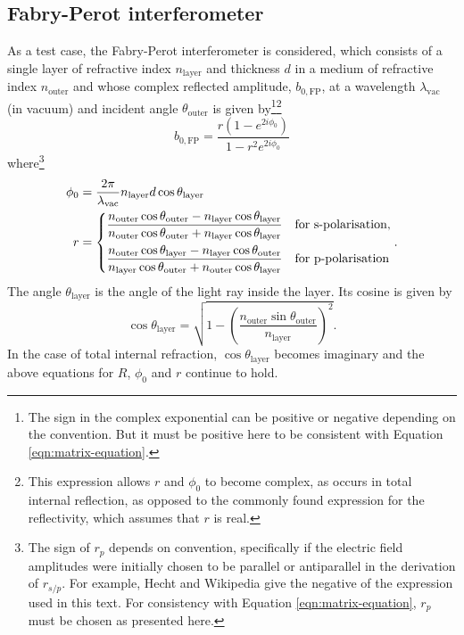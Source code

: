 \documentclass[]{article}
\begin{document}
	\subsection{Fabry-Perot interferometer}
As a test case, the Fabry-Perot interferometer is considered, which consists of a single layer of refractive index $n_\text{layer}$ and thickness $d$ in a medium of refractive index $n_\text{outer}$ and whose complex reflected amplitude, $b_{0,\text{FP}}$, at a wavelength $\lambda_\text{vac}$ (in vacuum) and incident angle $\theta_\text{outer}$ is given by\footnote{The sign in the complex exponential can be positive or negative depending on the convention. But it must be positive here to be consistent with Equation \ref{eqn:matrix-equation}.}\footnote{This expression allows $r$ and $\phi_0$ to become complex, as occurs in total internal reflection, as opposed to the commonly found expression for the reflectivity, which assumes that $r$ is real.}
\begin{equation}
	b_{0,\text{FP}}=\frac{r(1-e^{2i\phi_0})}{1-r^2 e^{2i\phi_0}}
\end{equation}
where\footnote{The sign of $r_p$ depends on convention, specifically if the electric field amplitudes were initially chosen to be parallel or antiparallel in the derivation of $r_{s/p}$. For example, Hecht and Wikipedia give the negative of the expression used in this text. For consistency with Equation \ref{eqn:matrix-equation}, $r_p$ must be chosen as presented here.}
\begin{align}
	\phi_0&=\frac{2\pi}{\lambda_\text{vac}}n_\text{layer}d\cos\theta_\text{layer}\\
	r&=
	\begin{dcases}
		\frac{n_\text{outer}\cos\theta_\text{outer}-n_\text{layer}\cos\theta_\text{layer}}{n_\text{outer}\cos\theta_\text{outer}+n_\text{layer}\cos\theta_\text{layer}}&\text{for s-polarisation},\\
		\frac{n_\text{outer}\cos\theta_\text{layer}-n_\text{layer}\cos\theta_\text{outer}}{n_\text{layer}\cos\theta_\text{outer}+n_\text{outer}\cos\theta_\text{layer}}&\text{for p-polarisation}
	\end{dcases}.
\end{align}
The angle $\theta_\text{layer}$ is the angle of the light ray inside the layer. Its cosine is given by
\begin{equation}
	\cos\theta_\text{layer}=\sqrt{1-\left(\frac{n_\text{outer}\sin\theta_\text{outer}}{n_\text{layer}}\right)^2}.
\end{equation}
In the case of total internal refraction, $\cos\theta_\text{layer}$ becomes imaginary and the above equations for $R$, $\phi_0$ and $r$ continue to hold.
\end{document}
